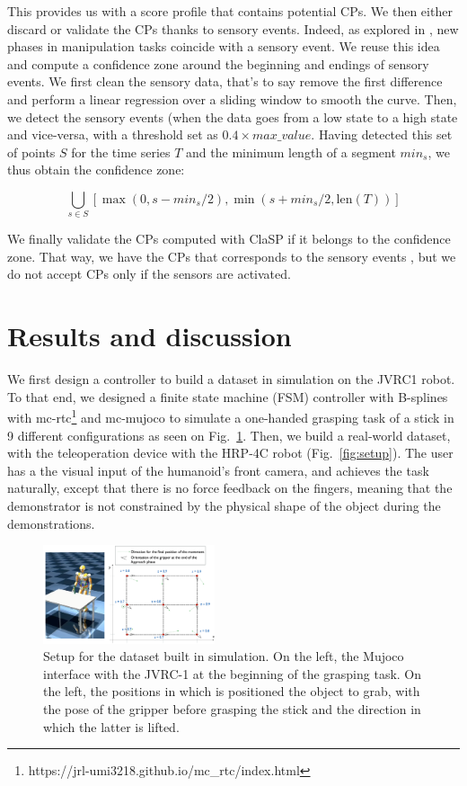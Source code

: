 \documentclass[conference]{IEEEtran}
\begin{document}
This provides us with a score profile that contains potential CPs. We then either discard or validate the CPs thanks to sensory events. Indeed, as explored in \cite{sensory_seg}, new phases in manipulation tasks coincide  with a sensory event. We reuse this idea and compute a confidence zone around the beginning and endings of sensory events. We first clean the sensory data, that's to say remove the first difference and perform a linear regression over a sliding window to smooth the curve. Then,  we detect the sensory events  (when the data goes from a low state to a high  state and vice-versa, with a threshold set as $0.4\times max\_value$. Having detected this set of points $S$ for the time series $T$ and the minimum length of a segment $min_s$, we thus obtain the confidence zone:

\begin{equation}
        \bigcup_{s \in S} \left[ \max(0, s - min_s/2),\min(s + min_s/2, \text{len}(T)) \right]
\end{equation}

We finally validate the CPs computed with ClaSP if it belongs to the confidence zone. That way, we have the CPs that corresponds to the sensory events , but we do not accept CPs only if the sensors are activated.

\section{Results and discussion} \label{results}

 We first design a controller to build a dataset in  simulation on the JVRC1 robot. To that end, we designed a finite state machine (FSM) controller with B-splines with mc-rtc\footnote{https://jrl-umi3218.github.io/mc\_rtc/index.html} and mc-mujoco\cite{singh2023mc} to simulate a one-handed grasping task of a stick in 9 different configurations as seen on Fig.~\ref{fig:simSetup}. Then, we build a real-world dataset, with the teleoperation device  with the HRP-4C robot (Fig.~\ref{fig:setup}). The user has a the visual input of the humanoid's front camera, and achieves the task naturally, except that there is no force  feedback on the fingers, meaning that the demonstrator is not constrained by the physical shape of the object during the demonstrations.

\begin{figure}[t]
  \centering
  \includegraphics[width=0.45\textwidth]{img/simSetup6.png}
  \caption{Setup for the dataset built in simulation. On the left, the Mujoco interface with the JVRC-1 \cite{jvrc} at the beginning of the grasping task. On the left, the positions in which is positioned the object to grab, with the pose of the gripper before grasping the stick and the direction in which the latter is lifted.}
  \label{fig:simSetup}
\end{figure}
\end{document}
